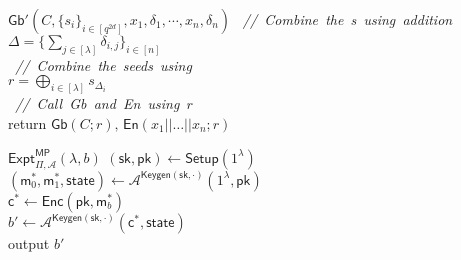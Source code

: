 \documentclass{article}
\newcommand{\comment}[1]{{\sl\small\color{black!50} \mbox{ // #1 }}}
\begin{document}
\begin{ccodebox}{$\mathsf{Gb}'(C, \{s_i\}_{i \in [q^{2d}]}, x_1, \delta_1, \cdots, x_n, \delta_n)$}
    \comment{Combine the \delta{}s using addition}\\
    $\Delta = \{ \sum_{j \in [\lambda]}  \delta_{i,j} \}_{i \in [n]}$\\
    \comment{Combine the seeds using \Delta}\\
    $r = \bigoplus_{i \in [\lambda]} s_{\Delta_i}$\\
    \comment{Call \textsf{Gb} and \textsf{En} using $r$}\\
    return $\textsf{Gb}(C; r),\, \textsf{En}(x_1 || \dots || x_n; r)$
\end{ccodebox}

\vspace{2em}

\newcommand{\secparam}{\ensuremath{\lambda}\xspace}

\newcommand{\FE}{\ensuremath{\mathsf{FE}}\xspace}
\newcommand{\Setup}{\ensuremath{\mathsf{Setup}}\xspace}
\newcommand{\Keygen}{\ensuremath{\mathsf{Keygen}}\xspace}
\newcommand{\Enc}{\ensuremath{\mathsf{Enc}}\xspace}
\newcommand{\Dec}{\ensuremath{\mathsf{Dec}}\xspace}

\newcommand{\sk}{\ensuremath{\mathsf{sk}}\xspace}
\newcommand{\pk}{\ensuremath{\mathsf{pk}}\xspace}
\newcommand{\ct}{\ensuremath{\mathsf{ct}}\xspace}
\newcommand{\cc}{\ensuremath{\mathsf{c}}\xspace}
\newcommand{\ek}{\ensuremath{\mathsf{ek}}\xspace}
\newcommand{\mm}{\ensuremath{\mathsf{m}}\xspace}
\newcommand{\state}{\ensuremath{\mathsf{state}}\xspace}

\newcommand{\FFF}{\ensuremath{\mathcal{F}}\xspace}
\newcommand{\MMM}{\ensuremath{\mathcal{M}}\xspace}
\newcommand{\AAA}{\ensuremath{\mathcal{A}}\xspace}

\newcommand{\Z}{\ensuremath{\mathbb{Z}}\xspace}
\newcommand{\N}{\ensuremath{\mathbb{N}}\xspace}
\newcommand{\Zp}{\ensuremath{\mathbb{Z}_p}\xspace}
\newcommand{\bool}{\ensuremath{\{0,1\}}\xspace}

\newcommand{\pat}{\ensuremath{\mathsf{pat}}\xspace}
\newcommand{\interpolate}{\ensuremath{\mathsf{Interpolate}}\xspace}
\newcommand{\pair}{\ensuremath{\mathsf{pair}}\xspace}

\newcommand\defeq{\stackrel{\mathclap{\normalfont\mbox{\scriptsize def}}}{=}}

\newcommand{\Adv}[1]{\ensuremath{\mathsf{Adv}^{\mathsf{#1}}_{\Pi, \AAA}(\secparam)}\xspace}
\newcommand{\Expt}[2]{\ensuremath{\mathsf{Expt}_{\Pi, \AAA}^{\mathsf{#1}}(\secparam, #2)}\xspace}
\begin{codebox}{$\Expt{MP}{b}$}
    $(\sk, \pk) \gets \Setup(1^\secparam)$\\
    $(\mm_0^*, \mm_1^*, \state) \gets \AAA^{\Keygen(\sk, \cdot)}(1^\secparam, \pk)$\\
    $\cc^* \gets \Enc(\pk, \mm_b^*)$\\
    $b' \gets \AAA^{\Keygen(\sk, \cdot)}(\cc^*, \state)$\\
    \textsf{output} $b'$
\end{codebox}
\end{document}
